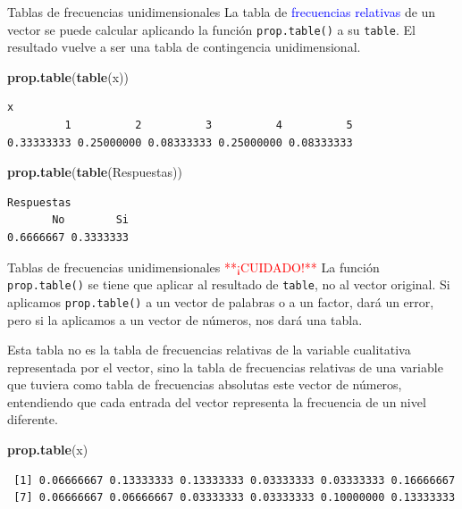 \documentclass[
  ignorenonframetext,
  aspectratio=169]{beamer}
\newenvironment{Shaded}{\begin{snugshade}}{\end{snugshade}}
\newcommand{\FunctionTok}[1]{\textcolor[rgb]{0.13,0.29,0.53}{\textbf{#1}}}
\newcommand{\NormalTok}[1]{#1}
\newcommand\blue[1]{\textcolor{blue}{#1}}
\newcommand\red[1]{\textcolor{red}{#1}}
\begin{document}
\begin{frame}[fragile]{Tablas de frecuencias unidimensionales}
\label{tablas-de-frecuencias-unidimensionales-8}
La tabla de \blue{frecuencias relativas} de un vector se puede calcular
aplicando la función \texttt{prop.table()} a su \texttt{table}. El
resultado vuelve a ser una tabla de contingencia unidimensional.

\begin{Shaded}
\begin{Highlighting}[]
\FunctionTok{prop.table}\NormalTok{(}\FunctionTok{table}\NormalTok{(x))}
\end{Highlighting}
\end{Shaded}

\begin{verbatim}
x
         1          2          3          4          5 
0.33333333 0.25000000 0.08333333 0.25000000 0.08333333 
\end{verbatim}

\begin{Shaded}
\begin{Highlighting}[]
\FunctionTok{prop.table}\NormalTok{(}\FunctionTok{table}\NormalTok{(Respuestas))}
\end{Highlighting}
\end{Shaded}

\begin{verbatim}
Respuestas
       No        Si 
0.6666667 0.3333333 
\end{verbatim}
\end{frame}

\begin{frame}[fragile]{Tablas de frecuencias unidimensionales}
\label{tablas-de-frecuencias-unidimensionales-9}
\red{**¡CUIDADO!**} La función \texttt{prop.table()} se tiene que
aplicar al resultado de \texttt{table}, no al vector original. Si
aplicamos \texttt{prop.table()} a un vector de palabras o a un factor,
dará un error, pero si la aplicamos a un vector de números, nos dará una
tabla.

Esta tabla no es la tabla de frecuencias relativas de la variable
cualitativa representada por el vector, sino la tabla de frecuencias
relativas de una variable que tuviera como tabla de frecuencias
absolutas este vector de números, entendiendo que cada entrada del
vector representa la frecuencia de un nivel diferente.

\begin{Shaded}
\begin{Highlighting}[]
\FunctionTok{prop.table}\NormalTok{(x)}
\end{Highlighting}
\end{Shaded}

\begin{verbatim}
 [1] 0.06666667 0.13333333 0.13333333 0.03333333 0.03333333 0.16666667
 [7] 0.06666667 0.06666667 0.03333333 0.03333333 0.10000000 0.13333333
\end{verbatim}
\end{frame}
\end{document}
